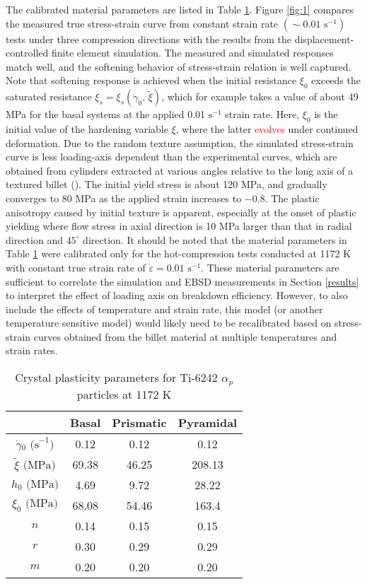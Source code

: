 \documentclass[review]{elsarticle}
\begin{document}
	The calibrated material parameters are listed in Table \ref{table:3}.
    Figure \ref{fig:1} compares the measured true stress-strain curve from constant strain rate $\left( \sim 0.01\text{ s}^{-1} \right)$ tests under three compression directions with the results  from the displacement-controlled finite element simulation.
	The measured and simulated responses match well, and the softening behavior of stress-strain relation is well captured.
	Note that softening response is achieved when the initial resistance $\xi_0$ exceeds the saturated resistance $\xi_s = \xi_s \left( \dot{\gamma}_0 ,\, \tilde{\xi} \right)$, which for example takes a value of about 49 MPa for the basal systems at the applied 0.01 $\text{s}^{-1}$ strain rate.
	Here, $\xi_0$ is the initial value of the hardening variable $\xi$, where the latter \textcolor{red}{evolves} under continued deformation.
	Due to the random texture assumption, the simulated stress-strain curve is less loading-axis dependent than the experimental curves, which are obtained from cylinders extracted at various angles relative to the long axis of a textured billet (\cite{r26}).
	The initial yield stress is about 120 MPa, and gradually converges to 80 MPa as the applied strain increases to $-0.8$.
	The plastic anisotropy caused by initial texture is apparent, especially at the onset of plastic yielding where flow stress in axial direction is 10 MPa larger than that in radial direction and $45^{\circ}$ direction.
	It should be noted that the material parameters in Table \ref{table:3} were calibrated only for the hot-compression tests conducted at 1172 K with constant true strain rate of $\dot{\varepsilon}=0.01\text{ s}^{-1}$.
	These material parameters are sufficient to correlate the simulation and EBSD measurements in Section \ref{results} to interpret the effect of loading axis on breakdown efficiency.
    However, to also include the effects of temperature and strain rate, this model (or another temperature sensitive model) would likely need to be recalibrated based on stress-strain curves obtained from the billet material at multiple temperatures and strain rates.
	\begin{table}[!htb]
	\centering
	\caption{\label{table:3}Crystal plasticity parameters for Ti-6242 $\alpha_p$ particles at 1172 K}
	\begin{tabular}{c c c c}
	\hline
	\,&Basal&Prismatic&Pyramidal\\
	\hline
	$\dot{\gamma}{_0}  \text{ (s}^{-1})$&0.12&0.12&0.12\\
	$\tilde{\xi} \text{ (MPa)}$&69.38&46.25&208.13\\
	$h_0 \text{ (MPa)}$&4.69&9.72&28.22\\
	$\xi_0 \text{ (MPa)}$&68.08&54.46&163.4\\
	$n$&0.14&0.15&0.15\\
	$r$&0.30&0.29&0.29\\
	$m$&0.20&0.20&0.20\\
	\hline
	\end{tabular}
	\end{table}
\end{document}
